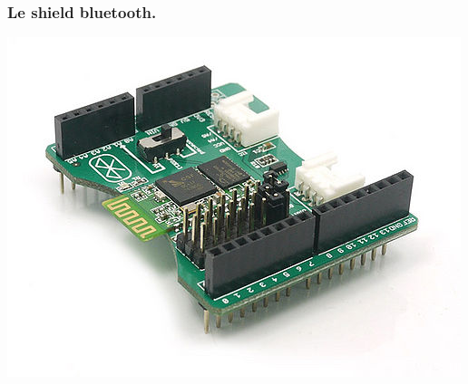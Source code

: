 \begin{frame}
    \frametitle{Le shield bluetooth.}
    \begin{center}
        \includegraphics[scale=0.25]{rcs/btshield.png}
    \end{center}
\end{frame}

